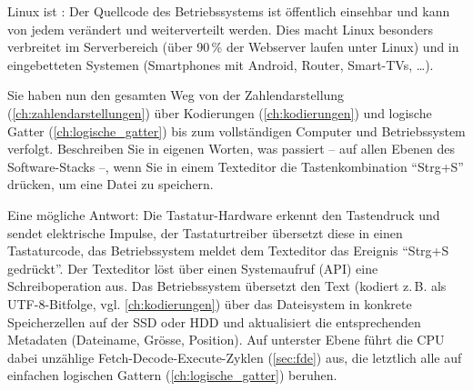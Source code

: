 \begin{myremark}
    Linux ist : Der Quellcode des Betriebssystems ist öffentlich einsehbar und kann von jedem verändert und weiterverteilt werden. Dies macht Linux besonders verbreitet im Serverbereich (über 90\,\% der Webserver laufen unter Linux) und in eingebetteten Systemen (Smartphones mit Android, Router, Smart-TVs, \ldots).
\end{myremark}

\begin{mychallenge}
    Sie haben nun den gesamten Weg von der Zahlendarstellung (\cref{ch:zahlendarstellungen}) über Kodierungen (\cref{ch:kodierungen}) und logische Gatter (\cref{ch:logische_gatter}) bis zum vollständigen Computer und Betriebssystem verfolgt. Beschreiben Sie in eigenen Worten, was passiert -- auf allen Ebenen des Software-Stacks --, wenn Sie in einem Texteditor die Tastenkombination \enquote{Strg+S} drücken, um eine Datei zu speichern.
    \begin{myanswer}
        Eine mögliche Antwort: Die Tastatur-Hardware erkennt den Tastendruck und sendet elektrische Impulse, der Tastaturtreiber übersetzt diese in einen Tastaturcode, das Betriebssystem meldet dem Texteditor das Ereignis \enquote{Strg+S gedrückt}. Der Texteditor löst über einen Systemaufruf (API) eine Schreiboperation aus. Das Betriebssystem übersetzt den Text (kodiert z.\,B. als UTF-8-Bitfolge, vgl. \cref{ch:kodierungen}) über das Dateisystem in konkrete Speicherzellen auf der SSD oder HDD und aktualisiert die entsprechenden Metadaten (Dateiname, Grösse, Position). Auf unterster Ebene führt die CPU dabei unzählige Fetch-Decode-Execute-Zyklen (\cref{sec:fde}) aus, die letztlich alle auf einfachen logischen Gattern (\cref{ch:logische_gatter}) beruhen.
    \end{myanswer}
\end{mychallenge}
